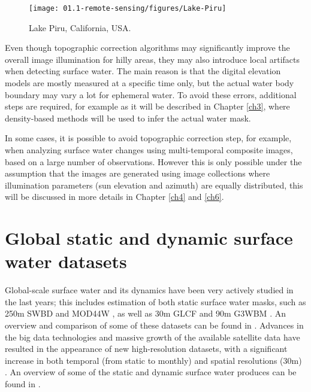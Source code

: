 \begin{wrapfigure}{r}{0.5\textwidth}
	\begin{center}
		\texttt{[image: 01.1-remote-sensing/figures/Lake-Piru]}
	\end{center}
	\caption{Lake Piru, California, USA. \protect \footnotemark}
\end{wrapfigure}


Even though topographic correction algorithms may significantly improve the overall image illumination for hilly areas, they may also introduce local artifacts when detecting surface water. The main reason is that the digital elevation models are mostly measured at a specific time only, but the actual water body boundary may vary a lot for ephemeral water. To avoid these errors, additional steps are required, for example as it will be described in Chapter \ref{ch3}, where density-based methods will be used to infer the actual water mask.

In some cases, it is possible to avoid topographic correction step, for example, when analyzing surface water changes using multi-temporal composite images, based on a large number of observations. However this is only possible under the assumption that the images are generated using image collections where illumination parameters (sun elevation and azimuth) are equally distributed, this will be discussed in more details in Chapter \ref{ch4} and \ref{ch6}.


\section{Global static and dynamic surface water datasets}
Global-scale surface water and its dynamics have been very actively studied in the last years; this includes estimation of both static surface water masks, such as 250m SWBD \citep{farr2007shuttle} and MOD44W \citep{carroll2009new}, as well as 30m GLCF \citep{feng2016global} and 90m G3WBM \citep{yamazaki2015development}. An overview and comparison of some of these datasets can be found in \citep{lamarche2017compilation}. Advances in the big data technologies and massive growth of the available satellite data have resulted in the appearance of new high-resolution datasets, with a significant increase in both temporal (from static to monthly) and spatial resolutions (30m) \citep{pekel2016high}. An overview of some of the static and dynamic surface water produces can be found in \citep{yamazaki2016hydrology}. 

